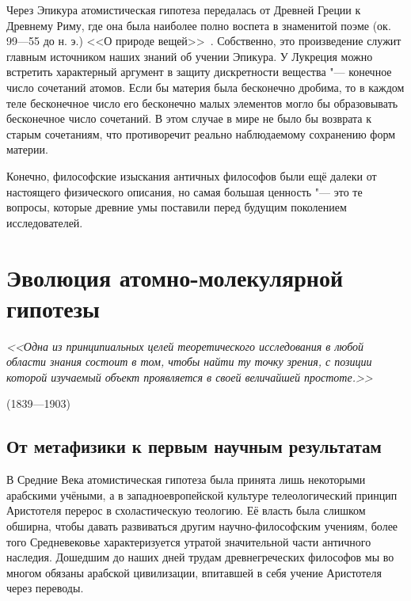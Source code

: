 \documentclass[a4paper, 12pt, oneside]{article} %
\begin{document}
Через Эпикура атомистическая гипотеза передалась от Древней Греции к
Древнему Риму, где она была наиболее полно воспета в знаменитой поэме
 (ок. 99---55 до н. э.) <<О природе
вещей>>~\cite{kar1983nature}. Собственно, это произведение служит
главным источником наших знаний об учении Эпикура. У Лукреция можно
встретить характерный аргумент в защиту дискретности вещества "---
конечное число сочетаний атомов. Если бы материя была бесконечно
дробима, то в каждом теле бесконечное число его бесконечно малых
элементов могло бы образовывать бесконечное число сочетаний. В этом
случае в мире не было бы возврата к старым сочетаниям, что противоречит
реально наблюдаемому сохранению форм материи.

Конечно, философские изыскания античных философов были ещё далеки от
настоящего физического описания, но самая большая ценность "--- это те
вопросы, которые древние умы поставили перед будущим поколением
исследователей.

\section{Эволюция атомно-молекулярной гипотезы}

\epigraph{\textit{<<Одна из принципиальных целей теоретического
исследования в любой области знания состоит в том, чтобы найти ту точку
зрения, с позиции которой изучаемый объект проявляется в своей
величайшей простоте.>>}}{ (1839---1903)}

\subsection{От метафизики к первым научным результатам}

В Средние Века атомистическая гипотеза была принята лишь некоторыми
арабскими учёными, а в западноевропейской культуре телеологический
принцип Аристотеля перерос в схоластическую теологию. Её власть была
слишком обширна, чтобы давать развиваться другим научно-философским
учениям, более того Средневековье характеризуется утратой значительной
части античного наследия. Дошедшим до наших дней трудам древнегреческих
философов мы во многом обязаны арабской цивилизации, впитавшей в себя
учение Аристотеля через переводы.
\end{document}
